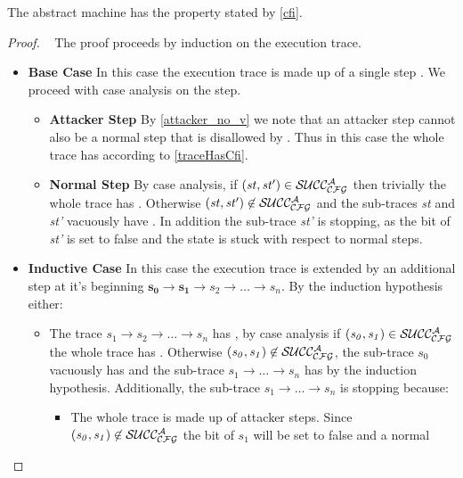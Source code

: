 \begin{theorem}\label{CFIabstract}
The abstract machine has the \CFI property stated by \cref{cfi}.
\end{theorem}

\begin{proof}
  ~ The proof proceeds by induction on the execution trace.
  \begin{itemize}
  \item \textbf{Base Case} In this case the execution trace is made up
    of a single step . We proceed with case analysis on
    the step.
    \begin{itemize}
    \item \textbf{Attacker Step} By \cref{attacker_no_v} we note that
      an attacker step cannot also be a normal step that is disallowed
      by . Thus in this case the whole trace has \CFI
      according to \cref{traceHasCfi}.
    \item \textbf{Normal Step} By case analysis, if
      $(\mathit{st},\mathit{st'}) \in \mathcal{SUCC_\mathcal{CFG}^{A}}$ then trivially the
      whole trace has \CFI. Otherwise $(\mathit{st},\mathit{st'}) \not
      \in \mathcal{SUCC_\mathcal{CFG}^{A}}$ and the sub-traces \textit{st} and \textit{st'}
      vacuously have \CFI. In addition the sub-trace \textit{st'} is
      stopping, as the \ok bit of \textit{st'} is set to false and the
      state is stuck with respect to normal steps.
    \end{itemize}
  \item \textbf{Inductive Case} In this case the execution trace is
    extended by an additional step at it's beginning
    $\mathbf{s_0 \to s_1} \to s_2 \to \ldots \to s_n$.
    By the induction hypothesis either:
    \begin{itemize}
    \item The trace $s_1 \to s_2 \to \ldots \to s_n$ has \CFI, by case
      analysis if $(\mathit{s_0},\mathit{s_1}) \in \mathcal{SUCC_\mathcal{CFG}^{A}}$ the
      whole trace has \CFI. Otherwise $(\mathit{s_0},\mathit{s_1})
      \not \in \mathcal{SUCC_\mathcal{CFG}^{A}}$, the sub-trace $s_0$ vacuously has \CFI and
      the sub-trace $s_1 \to \ldots \to s_n$ has \CFI by the induction
      hypothesis. Additionally, the sub-trace $s_1 \to \ldots \to s_n$
      is stopping because:
      \begin{itemize}
        \item The whole trace is made up of attacker steps.
           Since $(\mathit{s_0},\mathit{s_1}) \not \in \mathcal{SUCC_\mathcal{CFG}^{A}}$
           the \ok bit of $s_1$ will be set to false and a normal

\end{itemize}
\end{itemize}
\end{itemize}
\end{proof}
